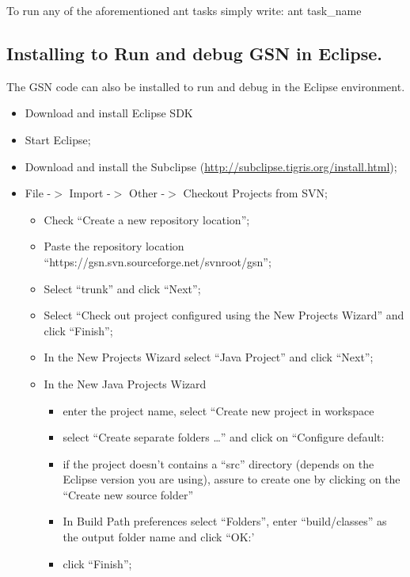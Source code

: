 {\footnotesize To run any of the aforementioned ant tasks simply
write: ant task\_name}

\subsection{Installing to Run and debug GSN in Eclipse.}

The GSN code can also be installed to run and debug in the Eclipse
environment.

\begin{itemize}
	\item Download and install Eclipse SDK
	\item Start Eclipse;
	\item Download and install the Subclipse
(\url{http://subclipse.tigris.org/install.html});
	\item File -\begin{math}>\end{math} Import -\begin{math}>\end{math} Other
-\begin{math}>\end{math} Checkout Projects from SVN;
\begin{itemize}
	\item Check \textquotedblleft{}Create a new repository
location\textquotedblright{};
	\item Paste the repository location
\textquotedblleft{}https://gsn.svn.sourceforge.net/svnroot/gsn\textquotedblright{};
	\item Select \textquotedblleft{}trunk\textquotedblright{} and click
\textquotedblleft{}Next\textquotedblright{};
	\item Select \textquotedblleft{}Check out project configured using the New
Projects Wizard\textquotedblright{} and click
\textquotedblleft{}Finish\textquotedblright{};
	\item In the New Projects Wizard select \textquotedblleft{}Java
Project\textquotedblright{} and click
\textquotedblleft{}Next\textquotedblright{};
	\item In the New Java Projects Wizard
\begin{itemize}
	\item enter the project name, select \textquotedblleft{}Create new project
in workspace
	\item select \textquotedblleft{}Create separate folders
\ldots{}\textquotedblright{} and click on \textquotedblleft{}Configure
default:
	\item if the project doesn't contains a \textquotedblleft{}src\textquotedblright{} directory (depends on the Eclipse version you are using), assure to create one by
		clicking on the \textquotedblleft{}Create new source folder\textquotedblright{}
	\item In Build Path preferences select
\textquotedblleft{}Folders\textquotedblright{}, enter
\textquotedblleft{}build/classes\textquotedblright{} as the output
folder name and click \textquotedblleft{}OK:'
	\item click \textquotedblleft{}Finish\textquotedblright{};
\end{itemize}


\end{itemize}
\end{itemize}
